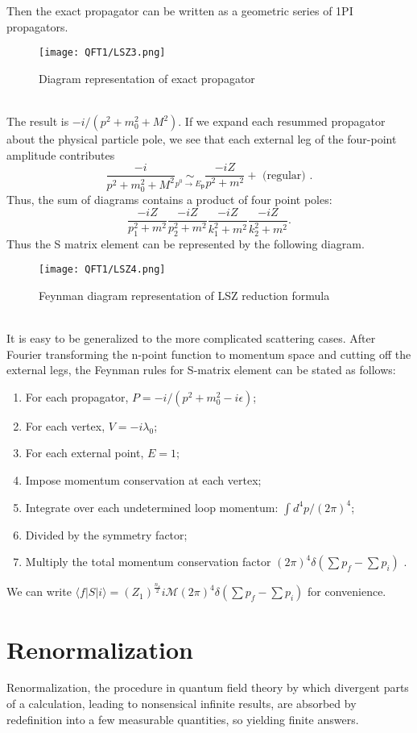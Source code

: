\noindent
Then the exact propagator can be written as a geometric series of 1PI propagators.
\begin{figure}[!h]
\centering
\texttt{[image: QFT1/LSZ3.png]}
\caption{Diagram representation of exact propagator}
\end{figure}
\\
The result is ${-i}/{(p^2 + m_0^2 + M^2)}$. If we expand each resummed propagator about the physical particle pole, we see that each external leg of the four-point amplitude contributes
\[\frac{-i}{p^2 + m_0^2 + M^2} \underset{p^0 \to E_{\bm{p}}}{\sim} \frac{-iZ}{p^2+m^2} + \mbox{ (regular) }.\]
Thus, the sum of diagrams contains a product of four point poles:
\[\frac{-iZ}{p_1^2 + m^2} \frac{-iZ}{p_2^2 + m^2} \frac{-iZ}{k_1^2 + m^2} \frac{-iZ}{k_2^2 + m^2}.\]
Thus the S matrix element can be represented by the following diagram.
\begin{figure}[!h]
\centering
\texttt{[image: QFT1/LSZ4.png]}
\caption{Feynman diagram representation of LSZ reduction formula}
\end{figure}
\\
It is easy to be generalized to the more complicated scattering cases. After Fourier transforming the n-point function to momentum space and cutting off the external legs, the Feynman rules for S-matrix element can be stated as follows:
\begin{enumerate}
\item For each propagator, $P = {-i}/{(p^2 + m_0^2 -i\epsilon)}$;
\item For each vertex, $V = -i\lambda_0$;
\item For each external point, $E=1$;
\item Impose momentum conservation at each vertex;
\item Integrate over each undetermined loop momentum: $\int {d^4p}/{(2\pi)^4}$;
\item Divided by the symmetry factor;
\item Multiply the total momentum conservation factor $(2\pi)^4 \delta(\sum p_f - \sum p_i)$ .
\end{enumerate}
We can write $\langle f | S | i \rangle = (Z_1)^{\frac{n_s}{2}} i \mathcal{M} (2\pi)^4 \delta(\sum p_f - \sum p_i)$ for convenience.

\section{Renormalization}
Renormalization, the procedure in quantum field theory by which divergent parts of a calculation, leading to nonsensical infinite results, are absorbed by redefinition into a few measurable quantities, so yielding finite answers.

